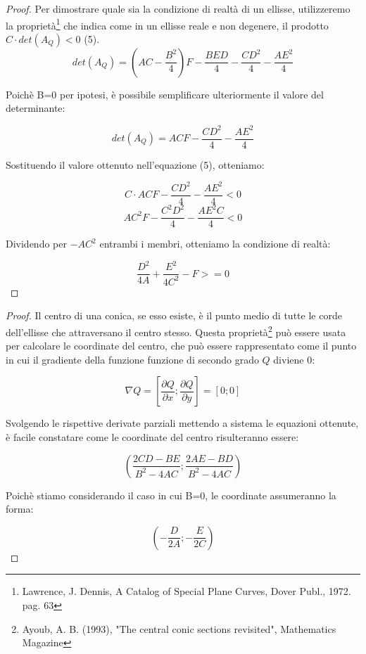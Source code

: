 \documentclass[10pt, a4paper]{article}
\theoremstyle{remark}
\begin{document}
	\begin{proof}
		Per dimostrare quale sia la condizione di realtà di un ellisse, utilizzeremo la proprietà\footnote{Lawrence, J. Dennis, A Catalog of Special Plane Curves, Dover Publ., 1972. pag. 63} che indica come in un ellisse reale e non degenere, il prodotto $C \cdot det(A_Q) < 0$  (5).\\
		
		$$
			det(A_Q) = \left( AC - \frac{B^2}{4} \right) F - \frac{BED}{4} - \frac{CD^2}{4} - \frac{AE^2}{4}
		$$
		
		Poichè B=0 per ipotesi, è possibile semplificare ulteriormente il valore del determinante:
		
		$$
			det(A_Q) = ACF - \frac{CD^2}{4} - \frac{AE^2}{4}
		$$
		
		Sostituendo il valore ottenuto nell'equazione (5), otteniamo:
		
		$$
		 C \cdot ACF - \frac{CD^2}{4} - \frac{AE^2}{4} < 0
		$$
		$$
		AC^2F - \frac{C^2D^2}{4} - \frac{AE^2C}{4} < 0
		$$
		
		Dividendo per $-AC^2$ entrambi i membri, otteniamo la condizione di realtà:
		
		$$
		\frac{D^2}{4A} + \frac{E^2}{4C^2} - F >= 0
		$$
		
	\end{proof}

	\begin{proof}
		Il centro di una conica, se esso esiste, è il punto medio di tutte le corde dell'ellisse che attraversano il centro stesso. Questa proprietà\footnote{Ayoub, A. B. (1993), "The central conic sections revisited", Mathematics Magazine} può essere usata per calcolare le coordinate del centro, che può essere rappresentato come il punto in cui il gradiente della funzione funzione di secondo grado $Q$ diviene 0: 
		
		$$\nabla Q = \left[ \frac{\partial Q}{\partial x} ; \frac{\partial Q}{\partial y} \right] = [0;0] $$
		
		Svolgendo le rispettive derivate parziali mettendo a sistema le equazioni ottenute, è facile constatare come le coordinate del centro risulteranno essere:
		
		$$ \left( \frac{2CD-BE}{B^2-4AC}; \frac{2AE-BD}{B^2-4AC} \right) $$
		
		Poichè stiamo considerando il caso in cui B=0, le coordinate assumeranno la forma:
		
		$$ \left( -\frac{D}{2A}; -\frac{E}{2C} \right) $$
		
	\end{proof}
	
\end{document}
